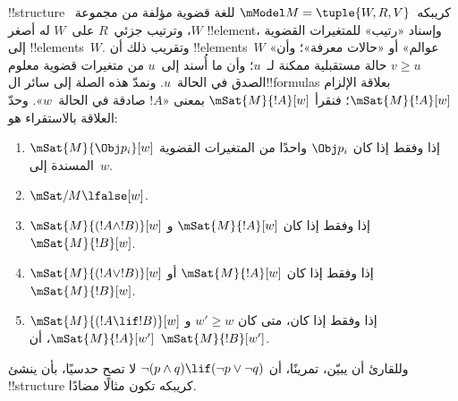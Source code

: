 \documentclass[../../../include/open-logic-section]{subfiles}
\begin{document}
!!{structure} كريبكه~$\mModel M = \tuple{W, R, V}$ للغة قضوية
مؤلفة من مجموعة~$W$، وترتيب جزئي~$R$ على~$W$ له أصغر
!!{element}، وإسناد «رتيب» للمتغيرات القضوية إلى !!{element}s~$W$.
وتقريب ذلك أن !!{element}s~$W$ «عوالم» أو «حالات معرفة»؛
وأن $v \geq u$ حالة مستقبلية ممكنة لـ~$u$؛ وأن ما أُسند
إلى~$u$ من متغيرات قضوية معلوم الصدق في الحالة~$u$.
ونمدّ هذه الصلة إلى سائر ال!!{formula}s بعلاقة الإلزام
$\mSat{M}{!A}[w]$؛ فنقرأ $\mSat{M}{!A}[w]$ بمعنى
«$!A$ صادقة في الحالة~$w$». وحدّ العلاقة بالاستقراء هو:
\begin{enumerate}
\item $\mSat{M}{\Obj p_i}[w]$ إذا وفقط إذا كان $\Obj p_i$ واحدًا من
  المتغيرات القضوية المسندة إلى~$w$.
\item $\mSat/{M}{\lfalse}[w]$.
\item $\mSat{M}{(!A \land !B)}[w]$ إذا وفقط إذا كان
  $\mSat{M}{!A}[w]$ و$\mSat{M}{!B}[w]$.
\item $\mSat{M}{(!A \lor !B)}[w]$ إذا وفقط إذا كان
  $\mSat{M}{!A}[w]$ أو $\mSat{M}{!B}[w]$.
\item $\mSat{M}{(!A \lif !B)}[w]$ إذا وفقط إذا كان، متى كان
  $w' \geq w$ و$\mSat{M}{!A}[w']$، أن $\mSat{M}{!B}[w']$.
\end{enumerate}
وللقارئ أن يبيّن، تمرينًا، أن $\lnot (p \land q) \lif
(\lnot p \lor \lnot q)$ لا تصح حدسيًا، بأن ينشئ !!{structure}
كريبكه تكون مثالًا مضادًا.
\end{document}
